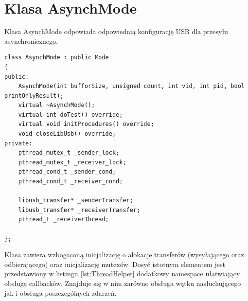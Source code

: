 \documentclass{BscUS}
\begin{document}
\section{Klasa AsynchMode}
Klasa AsynchMode odpowiada odpowiednią konfigurację USB dla przesyłu asynchronicznego. 

\begin{lstlisting}[caption={Deklaracja klasy SynchMode},label={lst:CAsynchMode}]
class AsynchMode : public Mode
{
public:
	AsynchMode(int bufforSize, unsigned count, int vid, int pid, bool printOnlyResult);
	virtual ~AsynchMode();
	virtual int doTest() override;
	virtual void initProcedures() override;
	void closeLibUsb() override;
private:
	pthread_mutex_t _sender_lock;
	pthread_mutex_t _receiver_lock;
	pthread_cond_t _sender_cond;
	pthread_cond_t _receiver_cond;

	libusb_transfer* _senderTransfer;
	libusb_transfer* _receiverTransfer;
	pthread_t _receiverThread;

};
\end{lstlisting}
Klasa zawiera wzbogaconą inicjalizację o alokacje transferów (wysyłającego oraz odbierającego) oraz inicjalizację mutexów.
\newline
Dosyć istotnym elementem jest przedstawiony w listingu \ref{lst:ThreadHelper} dodatkowy namespace ułatwiający obsługę callbacków. Znajduje się w nim zarówno obsługa wątku nasłuchującego jak i obsługa poszczególnych zdarzeń.
\end{document}
